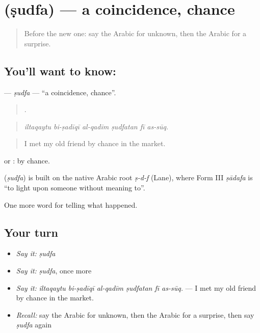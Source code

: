 \section[\texorpdfstring{\ar{صدفة} (ṣudfa)}{صدفة (ṣudfa)}]{ (ṣudfa) — a coincidence, chance}

\label{lesson:AR-C343-sudfa}



\begin{quote}
Before the new one: say the Arabic for unknown, then the Arabic for a surprise.
\end{quote}

\subsection*{You'll want to know: }
\textbf{} — \emph{ṣudfa} — \textquotedblleft{}a coincidence, chance\textquotedblright{}.

\begin{quote}
     .
\end{quote}

\begin{quote}
\emph{iltaqaytu bi-ṣadīqī al-qadīm ṣudfatan fī as-sūq.}
\end{quote}

\begin{quote}
I met my old friend by chance in the market.
\end{quote}

 or : by chance.

\begin{cousinweb}
\textbf{} (\emph{ṣudfa}) is built on the native Arabic root \emph{ṣ-d-f} (Lane), where Form III \emph{ṣādafa} is \textquotedblleft{}to light upon someone without meaning to\textquotedblright{}.
\end{cousinweb}

\begin{grammarlens}[title={What you've built}]
One more word for telling what happened.
\end{grammarlens}

\subsection*{Your turn}
\begin{itemize}
\raggedright
  \item \emph{Say it:} \emph{ṣudfa}
  \item \emph{Say it:} \emph{ṣudfa}, once more
  \item \emph{Say it:} \emph{iltaqaytu bi-ṣadīqī al-qadīm ṣudfatan fī as-sūq.} — I met my old friend by chance in the market.
  \item \emph{Recall:} say the Arabic for unknown, then the Arabic for a surprise, then say \emph{ṣudfa} again
\end{itemize}

